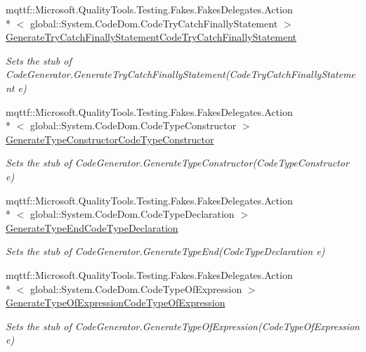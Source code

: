 \begin{DoxyCompactItemize}
mqttf\-::\-Microsoft.\-Quality\-Tools.\-Testing.\-Fakes.\-Fakes\-Delegates.\-Action\\*
$<$ global\-::\-System.\-Code\-Dom.\-Code\-Try\-Catch\-Finally\-Statement $>$ \hyperlink{class_system_1_1_code_dom_1_1_compiler_1_1_fakes_1_1_stub_code_compiler_a4e248d8362bfdb2888e6a2ae2a4bbf8a}{Generate\-Try\-Catch\-Finally\-Statement\-Code\-Try\-Catch\-Finally\-Statement}
\begin{DoxyCompactList}\small\item\em Sets the stub of Code\-Generator.\-Generate\-Try\-Catch\-Finally\-Statement(\-Code\-Try\-Catch\-Finally\-Statement e)\end{DoxyCompactList}\item 
mqttf\-::\-Microsoft.\-Quality\-Tools.\-Testing.\-Fakes.\-Fakes\-Delegates.\-Action\\*
$<$ global\-::\-System.\-Code\-Dom.\-Code\-Type\-Constructor $>$ \hyperlink{class_system_1_1_code_dom_1_1_compiler_1_1_fakes_1_1_stub_code_compiler_a69dfe03d441c571d0bd3c2c708c7c16b}{Generate\-Type\-Constructor\-Code\-Type\-Constructor}
\begin{DoxyCompactList}\small\item\em Sets the stub of Code\-Generator.\-Generate\-Type\-Constructor(\-Code\-Type\-Constructor e)\end{DoxyCompactList}\item 
mqttf\-::\-Microsoft.\-Quality\-Tools.\-Testing.\-Fakes.\-Fakes\-Delegates.\-Action\\*
$<$ global\-::\-System.\-Code\-Dom.\-Code\-Type\-Declaration $>$ \hyperlink{class_system_1_1_code_dom_1_1_compiler_1_1_fakes_1_1_stub_code_compiler_af3162baf3b387bbe2595fb6b4b31d330}{Generate\-Type\-End\-Code\-Type\-Declaration}
\begin{DoxyCompactList}\small\item\em Sets the stub of Code\-Generator.\-Generate\-Type\-End(\-Code\-Type\-Declaration e)\end{DoxyCompactList}\item 
mqttf\-::\-Microsoft.\-Quality\-Tools.\-Testing.\-Fakes.\-Fakes\-Delegates.\-Action\\*
$<$ global\-::\-System.\-Code\-Dom.\-Code\-Type\-Of\-Expression $>$ \hyperlink{class_system_1_1_code_dom_1_1_compiler_1_1_fakes_1_1_stub_code_compiler_a780e43a2067edcd2c77afcbff302d06f}{Generate\-Type\-Of\-Expression\-Code\-Type\-Of\-Expression}
\begin{DoxyCompactList}\small\item\em Sets the stub of Code\-Generator.\-Generate\-Type\-Of\-Expression(\-Code\-Type\-Of\-Expression e)\end{DoxyCompactList}\item 

\end{DoxyCompactItemize}
